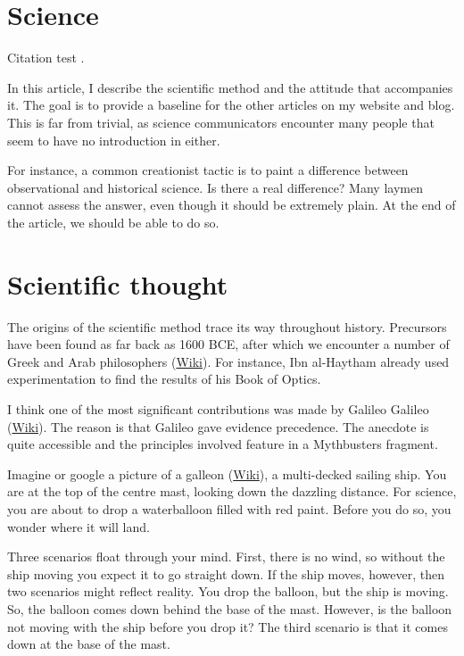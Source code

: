 \begin{multicols}{2}
\section{Science}
Citation test \cite{citetest}.


In this article, I describe the scientific method and the attitude that accompanies it. The goal is to provide a baseline
for the other articles on my website and blog. This is far from trivial, as science communicators encounter many people
that seem to have no introduction in either.


For instance, a common creationist tactic is to paint a difference between observational and historical science. Is there
a real difference? Many laymen cannot assess the answer, even though it should be extremely plain. At the end of the article, we
should be able to do so.

\section{Scientific thought}

The origins of the scientific method trace its way throughout history. Precursors have been found as far back as 1600 BCE,
after which we encounter a number of Greek and Arab philosophers (\href{http://en.wikipedia.org/wiki/List_of_ancient_Greek_philosophers}{Wiki}). For instance, Ibn al-Haytham already used experimentation
to find the results of his Book of Optics. 


I think one of the most significant contributions was made by Galileo Galileo (\href{https://en.wikipedia.org/wiki/Galileo_Galilei}{Wiki}). The reason is that Galileo gave evidence precedence. The anecdote is quite accessible and the principles involved
feature in a Mythbusters fragment.  


Imagine or google a picture of a galleon (\href{https://en.wikipedia.org/wiki/Galleon}{Wiki}), a multi-decked sailing ship.
You are at the top of the centre mast, looking down the dazzling distance. For science, you are about to drop a waterballoon filled with red paint.
Before you do so, you wonder where it will land.


Three scenarios float through your mind. First, there is no wind, so without the ship moving you expect it to go straight down. If the ship moves,
however, then two scenarios might reflect reality. You drop the balloon, but the ship is moving. So, the balloon comes down behind the base of
the mast. However, is the balloon not moving with the ship before you drop it? The third scenario is that it comes down at the base of the mast.



\end{multicols}
